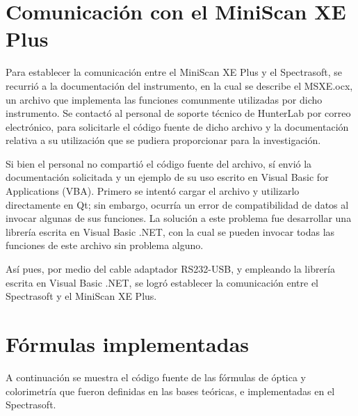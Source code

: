 \section{Comunicaci\'{o}n con el MiniScan XE Plus}

	Para establecer la comunicaci\'{o}n entre el MiniScan XE Plus y el Spectrasoft, se recurri\'{o} a la documentaci\'{o}n del instrumento, en la cual se describe el MSXE.ocx, un archivo que implementa las funciones comunmente utilizadas por dicho instrumento. Se contact\'{o} al personal de soporte t\'{e}cnico de HunterLab por correo electr\'{o}nico, para solicitarle el c\'{o}digo fuente de dicho archivo y la documentaci\'{o}n relativa a su utilizaci\'{o}n que se pudiera proporcionar para la investigaci\'{o}n.
	
	Si bien el personal no comparti\'{o} el c\'{o}digo fuente del archivo, s\'{i} envi\'{o} la documentaci\'{o}n solicitada y un ejemplo de su uso escrito en Visual Basic for Applications (VBA). Primero se intent\'{o} cargar el archivo y utilizarlo directamente en Qt; sin embargo, ocurr\'{i}a un error de compatibilidad de datos al invocar algunas de sus funciones. La soluci\'{o}n a este problema fue desarrollar una librer\'{i}a escrita en Visual Basic .NET, con la cual se pueden invocar todas las funciones de este archivo sin problema alguno.

	As\'{i} pues, por medio del cable adaptador RS232-USB, y empleando la librer\'{i}a escrita en Visual Basic .NET, se logr\'{o} establecer la comunicaci\'{o}n entre el Spectrasoft y el MiniScan XE Plus.
\newpage
\section{F\'{o}rmulas implementadas}
	A continuaci\'{o}n se muestra el c\'{o}digo fuente de las f\'{o}rmulas de \'{o}ptica y colorimetr\'{i}a que fueron definidas en las bases te\'{o}ricas, e implementadas en el Spectrasoft.
	

